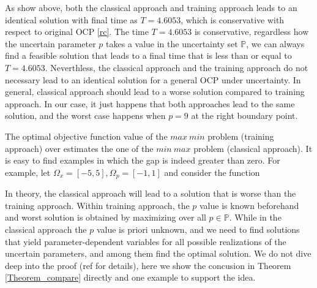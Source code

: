 
As show above, both the classical approach and training approach leads to an identical solution with final time as $T=4.6053$, which is conservative with respect to original OCP \ref{rc}. The time $T=4.6053$ is conservative, regardless how the uncertain parameter $p$ takes a value in the uncertainty set $\mathbb{P}$, we can always find a feasible solution that leads to a final time that is less than or equal to $T=4.6053$. Neverthless, the classical approach and the training approach do not necessary lead to an identical solution for a general OCP under uncertainty. In general, classical approach should lead to a worse solution compared to training approach. In our case, it just happens that both approaches lead to the same solution, and the worst case happens when $p=9$ at the right boundary point.  



The optimal objective function value of the $max\  min$ problem (training approach) over estimates the one of the $min\ max$ problem (classical approach). It is easy to find examples in which the gap is indeed greater than zero. For example, let $\Omega_x=[-5,5],\Omega_p=[-1,1]$ and consider the function

In theory, the classical approach will lead to a solution that is worse than the training approach. Within training approach, the $p$ value is known beforehand and worst solution is obtained by maximizing over all $p \in \mathbb{P}$. While in the classical approach the $p$ value is priori unknown, and we need to find solutions that yield parameter-dependent variables for all possible realizations of the uncertain parameters, and among them find the optimal solution. We do not dive deep into the proof (ref \cite{MatSch22} for details), here we show the concusion in Theorem \ref{Theorem_compare} directly and one example to support the idea. 

